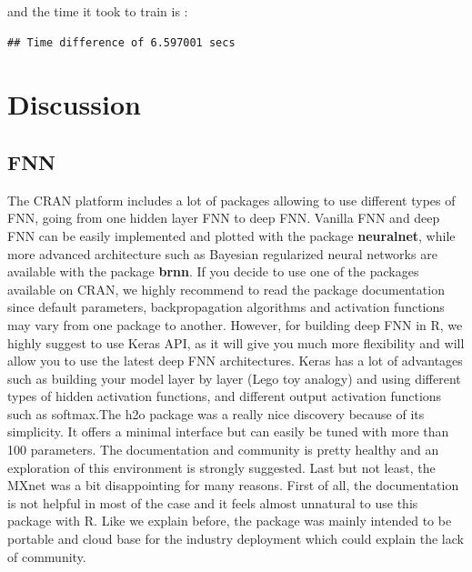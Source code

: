 \documentclass[letter,8pt]{article}\usepackage[]{graphicx}\usepackage[]{color}
\makeatletter
\newenvironment{kframe}{%
 \def\at@end@of@kframe{}%
 \ifinner\ifhmode%
  \def\at@end@of@kframe{\end{minipage}}%
  \begin{minipage}{\columnwidth}%
 \fi\fi%
 \def\FrameCommand##1{\hskip\@totalleftmargin \hskip-\fboxsep
 \colorbox{shadecolor}{##1}\hskip-\fboxsep
     \hskip-\linewidth \hskip-\@totalleftmargin \hskip\columnwidth}%
 \MakeFramed {\advance\hsize-\width
   \@totalleftmargin\z@ \linewidth\hsize
   \@setminipage}}%
 {\par\unskip\endMakeFramed%
 \at@end@of@kframe}
\newenvironment{knitrout}{}{} %
\makeatother
\begin{document}
and the time it took to train is :
\begin{knitrout}
\color{fgcolor}\begin{kframe}
\begin{verbatim}
## Time difference of 6.597001 secs
\end{verbatim}
\end{kframe}
\end{knitrout}


\newpage
\section{Discussion}
\subsection{FNN}
The CRAN platform includes a lot of packages allowing to use different types of FNN, going from one hidden layer FNN to deep FNN. Vanilla FNN and deep FNN can be easily implemented and plotted with the package \textbf{neuralnet}, while more advanced architecture such as Bayesian regularized neural networks are available with the package \textbf{brnn}. If you decide to use one of the packages available on CRAN, we highly recommend to read the package documentation since default parameters, backpropagation algorithms and activation functions may vary from one package to another. However, for building deep FNN in R, we highly suggest to use Keras API, as it will give you much more flexibility and will allow you to use the latest deep FNN architectures. Keras has a lot of advantages such as building your model layer by layer (Lego toy analogy) and using different types of hidden activation functions, and different output activation functions such as softmax.The h2o package was a really nice discovery because of its simplicity. It offers a minimal interface but can easily be tuned with more than 100 parameters. The documentation and community is pretty healthy and an exploration of this environment is strongly suggested. Last but not least, the MXnet was a bit disappointing for many reasons. First of all, the documentation is not helpful in most of the case and it feels almost unnatural to use this package with R. Like we explain before, the package was mainly intended to be portable and cloud base for the industry deployment which could explain the lack of community.
\end{document}
